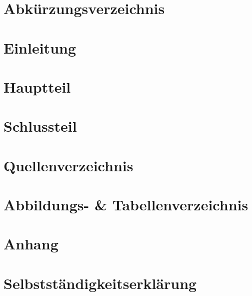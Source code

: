 \makeatletter

\makeatother



\newpage
\tableofcontents
\newpage


\section{Abkürzungsverzeichnis}


\section{Einleitung}


\section{Hauptteil}


\section{Schlussteil}


\section{Quellenverzeichnis}
\printbibliography[heading=none]
%

\section{Abbildungs- \& Tabellenverzeichnis}
\listoffigures
\listoftables

\clearpage
\section{Anhang}


\clearpage
\section*{Selbstständigkeitserklärung}





